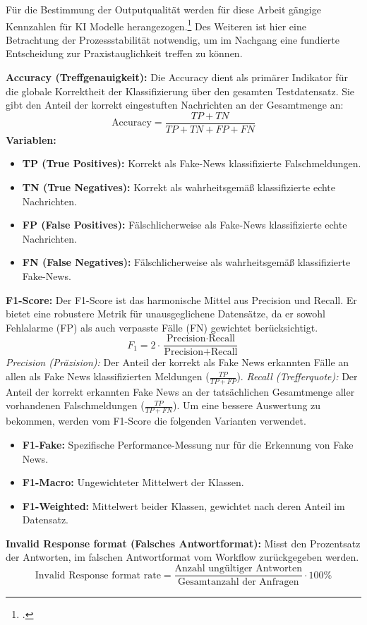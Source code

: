 \documentclass[12pt,a4paper]{article}
\begin{document}
    Für die Bestimmung der Outputqualität werden für diese Arbeit gängige Kennzahlen für KI Modelle herangezogen.\footnote{\cite[683]{ghanem-etal-2021-fakeflow}.}
    Des Weiteren ist hier eine Betrachtung der Prozessstabilität notwendig, um im Nachgang eine fundierte Entscheidung zur
    Praxistauglichkeit treffen zu können.

    \textbf{Accuracy (Treffgenauigkeit):}
    Die Accuracy dient als primärer Indikator für die globale Korrektheit der Klassifizierung über den gesamten Testdatensatz.
    Sie gibt den Anteil der korrekt eingestuften Nachrichten an der Gesamtmenge an:
    \[ \text{Accuracy} = \frac{TP + TN}{TP + TN + FP + FN} \]
    \textbf{Variablen:}
    \begin{itemize}
        \item \textbf{TP (True Positives):} Korrekt als Fake-News klassifizierte Falschmeldungen.
        \item \textbf{TN (True Negatives):} Korrekt als wahrheitsgemäß klassifizierte echte Nachrichten.
        \item \textbf{FP (False Positives):} Fälschlicherweise als Fake-News klassifizierte echte Nachrichten.
        \item \textbf{FN (False Negatives):} Fälschlicherweise als wahrheitsgemäß klassifizierte Fake-News.
    \end{itemize}


    \textbf{F1-Score:}
    Der F1-Score ist das harmonische Mittel aus Precision und Recall. Er bietet eine robustere Metrik für
    unausgeglichene Datensätze, da er sowohl Fehlalarme (FP) als auch verpasste Fälle (FN) gewichtet berücksichtigt.\newline
    \[ F_1 = 2 \cdot \frac{\text{Precision} \cdot \text{Recall}}{\text{Precision} + \text{Recall}} \]
    \textit{Precision (Präzision):} Der Anteil der korrekt als Fake News erkannten Fälle an allen als Fake News klassifizierten Meldungen ($\frac{TP}{TP + FP}$). \newline
    \textit{Recall (Trefferquote):} Der Anteil der korrekt erkannten Fake News an der tatsächlichen Gesamtmenge aller vorhandenen Falschmeldungen ($\frac{TP}{TP + FN}$).
    \newline
    Um eine bessere Auswertung zu bekommen, werden vom F1-Score die folgenden Varianten verwendet.
    \begin{itemize}
        \item \textbf{F1-Fake:} Spezifische Performance-Messung nur für die Erkennung von Fake News.
        \item \textbf{F1-Macro:} Ungewichteter Mittelwert der Klassen.
        \item \textbf{F1-Weighted:} Mittelwert beider Klassen, gewichtet nach deren Anteil im Datensatz.
    \end{itemize}
    \textbf{Invalid Response format (Falsches Antwortformat):}
    Misst den Prozentsatz der Antworten, im falschen Antwortformat vom Workflow zurückgegeben werden.
    \[ \text{Invalid Response format rate} = \frac{\text{Anzahl ungültiger Antworten}}{\text{Gesamtanzahl der Anfragen}} \cdot 100\% \]
\end{document}
